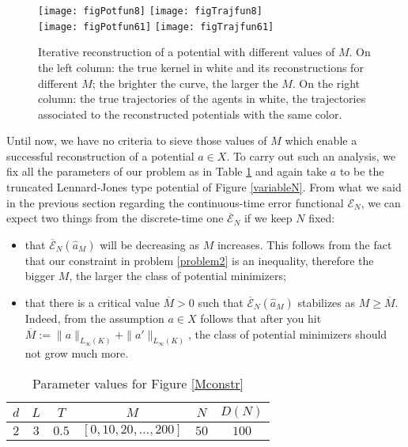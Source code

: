 \begin{figure}[h!]
\begin{center}
\texttt{[image: figPotfun8]}
\texttt{[image: figTrajfun8]}\\
\texttt{[image: figPotfun61]}
\texttt{[image: figTrajfun61]}
\end{center}
\caption{Iterative reconstruction of a potential with different values of $M$. On the left column: the true kernel in white and its reconstructions for different $M$; the brighter the curve, the larger the $M$. On the right column: the true trajectories of the agents in white, the trajectories associated to the reconstructed potentials with the same color.}\label{Mconstr1}
\end{figure}

Until now, we have no criteria to sieve those values of $M$ which enable a successful reconstruction of a potential $a \in X$. To carry out such an analysis, we fix all the parameters of our problem as in Table \ref{tab:fig4} and again take $a$ to be the truncated Lennard-Jones type potential of Figure \ref{variableN}. From what we said in the previous section regarding the continuous-time error functional $\mathcal{E}_N$, we can expect two things from the discrete-time one $\overline{\mathcal{E}}_N$ if we keep $N$ fixed:
\begin{itemize}
\item that $\overline{\mathcal{E}}_N(\widehat{a}_M)$ will be decreasing as $M$ increases. This follows from the fact that our constraint in problem \eqref{problem2} is an inequality, therefore the bigger $M$, the larger the class of potential minimizers;
\item that there is a critical value $\overline{M} > 0$ such that $\overline{\mathcal{E}}_N(\widehat{a}_M)$ stabilizes as $M \geq \overline{M}$. Indeed, from the assumption $a \in X$ follows that after you hit $\overline{M} := \|a\|_{L_{\infty}(K)} + \|a'\|_{L_{\infty}(K)}$, the class of potential minimizers should not grow much more.
\end{itemize}

\begin{table}[h]
\begin{center}
\begin{tabular}{ |c|c|c|c|c|c| }
\hline
  $d$ & $L$ & $T$ & $M$ & $N$ & $D(N)$ \\
\hline
\hline
  $2$ & $3$ & $0.5$ & $[0,10,20,\ldots,200]$ & $50$ & $100$ \\
\hline
\end{tabular}
\end{center}
\vspace{-0.5cm}
\caption{Parameter values for Figure \ref{Mconstr}} \label{tab:fig4} 
\end{table}

